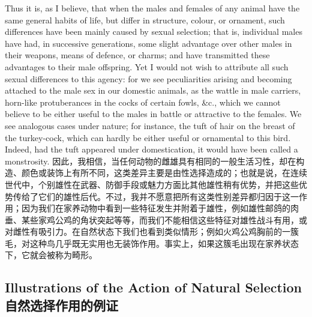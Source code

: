 \darwinpair
{Thus it is, as I believe, that when the males and females of any animal have the same general habits of life, but differ in structure, colour, or ornament, such differences have been mainly caused by sexual selection; that is, individual males have had, in successive generations, some slight advantage over other males in their weapons, means of defence, or charms; and have transmitted these advantages to their male offspring. Yet I would not wish to attribute all such sexual differences to this agency: for we see peculiarities arising and becoming attached to the male sex in our domestic animals, as the wattle in male carriers, horn-like protuberances in the cocks of certain fowls, \&c., which we cannot believe to be either useful to the males in battle or attractive to the females. We see analogous cases under nature; for instance, the tuft of hair on the breast of the turkey-cock, which can hardly be either useful or ornamental to this bird. Indeed, had the tuft appeared under domestication, it would have been called a monstrosity.}
{因此，我相信，当任何动物的雌雄具有相同的一般生活习性，却在构造、颜色或装饰上有所不同，这类差异主要是由性选择造成的；也就是说，在连续世代中，个别雄性在武器、防御手段或魅力方面比其他雄性稍有优势，并把这些优势传给了它们的雄性后代。不过，我并不愿意把所有这类性别差异都归因于这一作用；因为我们在家养动物中看到一些特征发生并附着于雄性，例如雄性邮鸽的肉垂、某些家鸡公鸡的角状突起等等，而我们不能相信这些特征对雄性战斗有用，或对雌性有吸引力。在自然状态下我们也看到类似情形；例如火鸡公鸡胸前的一簇毛，对这种鸟几乎既无实用也无装饰作用。事实上，如果这簇毛出现在家养状态下，它就会被称为畸形。}

\subsection*{Illustrations of the Action of Natural Selection\\自然选择作用的例证}

